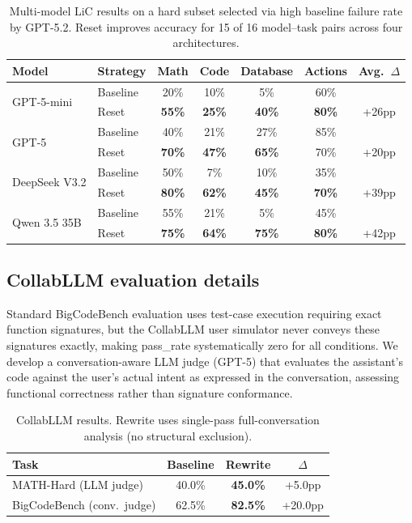 \documentclass{article} %
\begin{document}
\begin{table}[h]
\centering
\begin{tabular}{llccccc}
\toprule
\textbf{Model} & \textbf{Strategy} & \textbf{Math} & \textbf{Code} & \textbf{Database} & \textbf{Actions} & \textbf{Avg.\ $\Delta$} \\
\midrule
\multirow{2}{*}{GPT-5-mini} & Baseline & 20\% & 10\% & 5\% & 60\% & \\
 & Reset & \textbf{55\%} & \textbf{25\%} & \textbf{40\%} & \textbf{80\%} & +26pp \\
\midrule
\multirow{2}{*}{GPT-5} & Baseline & 40\% & 21\% & 27\% & 85\% & \\
 & Reset & \textbf{70\%} & \textbf{47\%} & \textbf{65\%} & 70\% & +20pp \\
\midrule
\multirow{2}{*}{DeepSeek V3.2} & Baseline & 50\% & 7\% & 10\% & 35\% & \\
 & Reset & \textbf{80\%} & \textbf{62\%} & \textbf{45\%} & \textbf{70\%} & +39pp \\
\midrule
\multirow{2}{*}{Qwen 3.5 35B} & Baseline & 55\% & 21\% & 5\% & 45\% & \\
 & Reset & \textbf{75\%} & \textbf{64\%} & \textbf{75\%} & \textbf{80\%} & +42pp \\
\bottomrule
\end{tabular}
\caption{Multi-model LiC results on a hard subset selected via high baseline failure rate by GPT-5.2. Reset improves accuracy for 15 of 16 model--task pairs across four architectures.}
\label{tab:multi-model}
\end{table}

\subsection{CollabLLM evaluation details}
\label{app:collabllm}

Standard BigCodeBench evaluation uses test-case execution requiring exact function signatures, but the CollabLLM user simulator never conveys these signatures exactly, making pass\_rate systematically zero for all conditions. We develop a conversation-aware LLM judge (GPT-5) that evaluates the assistant's code against the user's actual intent as expressed in the conversation, assessing functional correctness rather than signature conformance.

\begin{table}[h]
\centering
\begin{tabular}{lccc}
\toprule
\textbf{Task} & \textbf{Baseline} & \textbf{Rewrite} & \textbf{$\Delta$} \\
\midrule
MATH-Hard (LLM judge) & 40.0\% & \textbf{45.0\%} & +5.0pp \\
BigCodeBench (conv.\ judge) & 62.5\% & \textbf{82.5\%} & +20.0pp \\
\bottomrule
\end{tabular}
\caption{CollabLLM results. Rewrite uses single-pass full-conversation analysis (no structural exclusion).}
\label{tab:collabllm}
\end{table}
\end{document}
